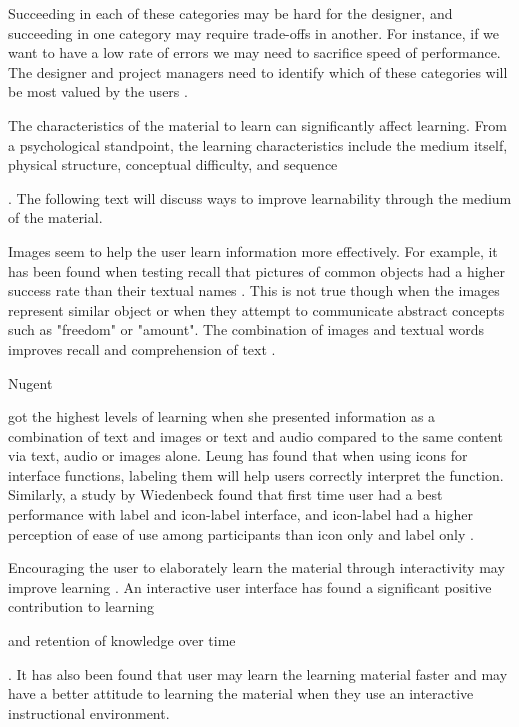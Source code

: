 Succeeding in each of these categories may be hard for the designer, and succeeding in one category may require trade-offs in another. For instance, if we want to have a low rate of errors we may need to sacrifice speed of performance. The designer and project managers need to identify which of these categories will be most valued by the users \cite{Shneiderman2004}.


The characteristics of the material to learn can significantly affect learning. From a psychological standpoint, the learning characteristics include the medium itself, physical structure, conceptual difficulty, and sequence . The following text will discuss ways to improve learnability through the medium of the material.

Images seem to help the user learn information more effectively. For example, it has been found when testing recall that pictures of common objects had a higher success rate than their textual names \cite{Lieberman1965} \cite{Nelson1976} \cite{Paivio1969} \cite{Paivio1973}. This is not true though when the images represent similar object \cite{Nelson1976} or when they attempt to communicate abstract concepts such as "freedom" or "amount". The combination of images and textual words improves recall \cite{Paivio1973} and comprehension of text \cite{Levie1982}.

Nugent  got the highest levels of learning when she presented information as a combination of text and images or text and audio compared to the same content via text, audio or images alone. Leung \cite{Leung2009} has found that when using icons for interface functions, labeling them will help users correctly interpret the function. Similarly, a study by Wiedenbeck found that first time user had a best performance with label and icon-label interface, and icon-label had a higher perception of ease of use among participants than icon only and label only \cite{Wiedenbeck1999}.

Encouraging the user to elaborately learn the material through interactivity may improve learning \cite{Bower1970} \cite{Jacoby1979} \cite{Bosco1990}. An interactive user interface has found a significant positive contribution to learning \cite{Bosco1990} \cite{Fletcher1989}  and retention of knowledge over time . It has also been found that user may learn the learning material faster and may have a better attitude to learning the material when they use an interactive instructional environment. 

